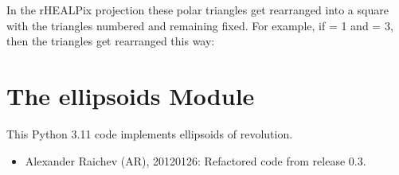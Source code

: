 \documentclass[a4paper,12ptopenany,oneside,english]{sphinxmanual}
\begin{document}
\begin{fulllineitems}
\sphinxAtStartPar
In the rHEALPix projection these polar triangles get rearranged
into a square with the triangles numbered  and 
remaining fixed.
For example, if  = 1 and  = 3,
then the triangles get rearranged this way:

\begin{sphinxVerbatim}[commandchars=\\\{\}]
       
                            
                            
                            

   
                            
                            
                            
\end{sphinxVerbatim}

\end{fulllineitems}


\sphinxstepscope


\chapter{The ellipsoids Module}
\label{\detokenize{ellipsoids:module-rhealpixdggs.ellipsoids}}\label{\detokenize{ellipsoids:the-ellipsoids-module}}\label{\detokenize{ellipsoids::doc}}
\sphinxAtStartPar
This Python 3.11 code implements ellipsoids of revolution.
\begin{itemize}
\item {} 
\sphinxAtStartPar
Alexander Raichev (AR), 2012\sphinxhyphen{}01\sphinxhyphen{}26: Refactored code from release 0.3.

\end{itemize}
\end{document}
